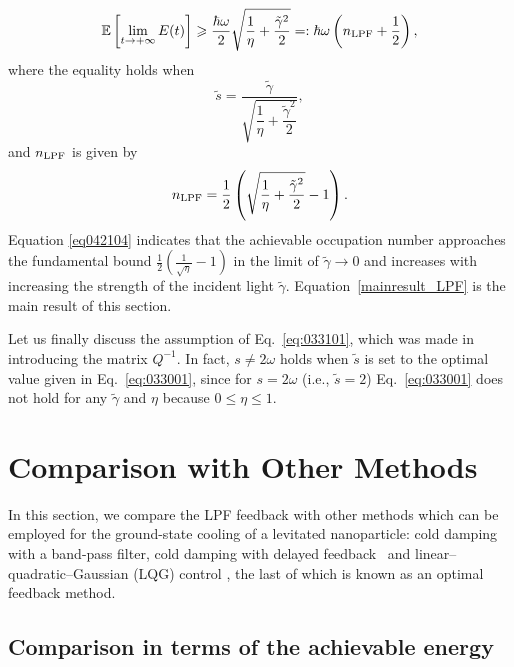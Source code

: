 \documentclass[aps,pra,superscriptaddress,twocolumn
]{revtex4-2}
\begin{document}
 \begin{equation}
  \mathbb{E} \left[\lim_{t\to +\infty} E(t)\right] \geqslant 
  \frac{\hbar\omega}{2}\sqrt{\frac{1}{\eta} + \frac{\tilde\gamma^2}{2}}
  =: \hbar \omega \left(n_{\rm LPF} + \frac{1}{2}\right), \label{mainresult_LPF}
 \end{equation}
 where the equality holds when 
 \begin{equation}
  \tilde s 
  = \frac{\tilde \gamma}{\sqrt{\dfrac{1}{\eta} + \dfrac{\tilde \gamma^2}{2}}}, 
  \label{eq:033001}
 \end{equation}
 and $n_{\rm LPF}$ is given by 
 \begin{equation}
  n_{\rm LPF} = \frac{1}{2} \left(\sqrt{\dfrac{1}{\eta} + \dfrac{\tilde \gamma^2}{2}} - 1 \right).
  \label{eq042104}
 \end{equation}
 Equation \eqref{eq042104} indicates that 
 the achievable occupation number approaches 
 the fundamental bound $\frac{1}{2} (\frac{1}{\sqrt{\eta}}-1)$ 
 in the limit of $\tilde \gamma \to 0$ and 
 increases with increasing the strength of the incident light $\tilde \gamma$.
 Equation~\eqref{mainresult_LPF} is the main result of this section.
 
 
 Let us finally discuss the assumption of Eq.~\eqref{eq:033101}, 
 which was made in introducing the matrix $Q^{-1}$.
 In fact, $s\neq 2\omega$ holds when $\tilde s$ is set to the optimal value 
 given in Eq.~\eqref{eq:033001}, 
 since for $s=2\omega$ (i.e., $\tilde s = 2$) 
 Eq.~\eqref{eq:033001} does not hold for any $\tilde \gamma$ and $\eta$
 because $0\leqslant \eta \leqslant 1$. 
 
 
 
 
 
 \section{Comparison with Other Methods}\label{sec:Discussion}
 
 

 
 In this section, we compare the LPF feedback with other methods 
 which {can be} employed for the ground-state cooling of a levitated nanoparticle: 
 cold damping {with a band-pass filter}, 
 {cold damping with delayed feedback~\cite{PhysRevLett.96.043003,tebbenjohanns2021quantum,Kamba:22}} and 
 linear--quadratic--Gaussian (LQG) control \cite{stengel1994optimal}, 
 the {last} of which is known as an optimal feedback method.
 



 \subsection{Comparison in terms of the achievable energy}
\end{document}
